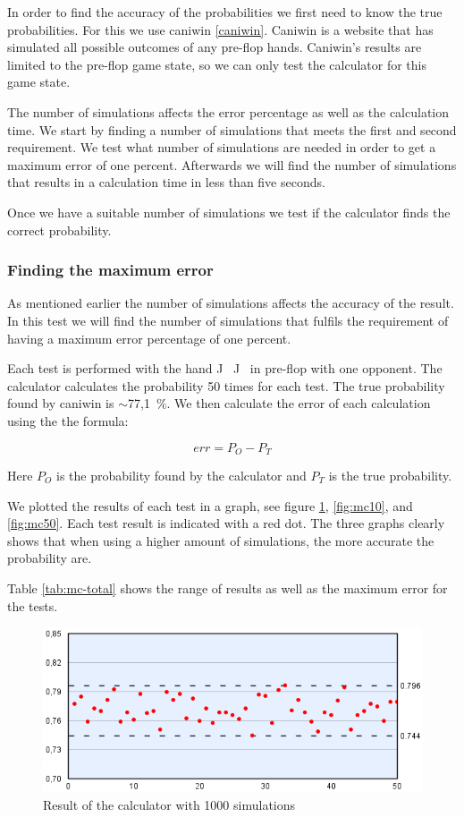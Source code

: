 In order to find the accuracy of the probabilities we first need to know the true probabilities. For this we use caniwin \ref{caniwin}. Caniwin is a website that has simulated all possible outcomes of any pre-flop hands. Caniwin's results are limited to the pre-flop game state, so we can only test the calculator for this game state.

The number of simulations affects the error percentage as well as the calculation time. We start by finding a number of simulations that meets the first and second requirement. We test what number of simulations are needed in order to get a maximum error of one percent. Afterwards we will find the number of simulations that results in a calculation time in less than five seconds.

Once we have a suitable number of simulations we test if the calculator finds the correct probability.

\subsubsection{Finding the maximum error}
\label{sec:mc-test1}
As mentioned earlier the number of simulations affects the accuracy of the result. In this test we will find the number of simulations that fulfils the requirement of having a maximum error percentage of one percent.

Each test is performed with the hand J\clubsuit ~ J\diamondsuit ~ in pre-flop with one opponent. The calculator calculates the probability 50 times for each test. The true probability found by caniwin is $\sim$77,1~\%. 
We then calculate the error of each calculation using the the formula:

\[err = P_{O} - P_{T}\]

Here $P_{O}$ is the probability found by the calculator and $P_{T} $ is the true probability. 

We plotted the results of each test in a graph, see figure \ref{fig:mc1}, \ref{fig:mc10}, and \ref{fig:mc50}. 
Each test result is indicated with a red dot. The three graphs clearly shows that when using a higher amount of simulations, the more accurate the probability are.

Table \ref{tab:mc-total} shows the range of results as well as the maximum error for the tests.

\begin{figure}[H]
  \center
    \includegraphics[scale=0.775]{images/MonteCarlo/1k.png}
  \caption{Result of the calculator with 1000 simulations \label{fig:mc1}}
\end{figure}

